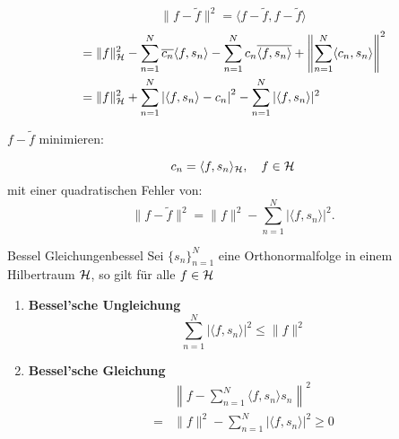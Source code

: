 \begin{equation*}
  \|f - \tilde{f}\|^{2} = \langle f - \tilde{f}, f - \tilde{f} \rangle
\end{equation*}
\begin{align*}
  &= \|f\|_{\mathcal{H}}^{2} - \sum\limits_{n=1}^{N}\overline{c_{n}} \langle f, s_{n} \rangle - \sum\limits_{n=1}^{N}c_{n} \overline{\langle f, s_{n}\rangle}  + {\left\|\sum\limits_{n=1}^{N}\langle c_{n}, s_{n} \rangle \right\|}^{2}\\
  &= \|f\|_{\mathcal{H}}^{2} + \sum\limits_{n=1}^{N}\left|\langle f, s_{n} \rangle - c_{n}\right|^{2} - \sum\limits_{n=1}^{N}|\langle f, s_{n} \rangle |^{2}
\end{align*}

$f - \tilde{f}$ minimieren:
\begin{tcolorbox}[title={Kooeffizienten für die Approximation}, colback=white!, colframe=black!40]
\begin{equation}
  c_{n} = \langle f, s_{n} \rangle_{\mathcal{H}}, \quad f \in \mathcal{H}
\end{equation}
mit einer quadratischen Fehler von:
\begin{equation}
  \|f - \tilde{f}\|^{2} = \|f\|^{2} - \sum\limits_{n=1}^{N}|\langle f,s_{n} \rangle |^{2}.
\end{equation}
\end{tcolorbox}

\begin{mytheo}{Bessel Gleichungen}{bessel}
  Sei $\{s_{n}\}_{n=1}^{N}$ eine Orthonormalfolge in einem Hilbertraum $\mathcal{H}$, so gilt für alle $f \in \mathcal{H}$
  \begin{enumerate}
    \item \textbf{Bessel'sche Ungleichung}
          \begin{equation}
            \sum\limits_{n=1}^{N} |\langle f, s_{n} \rangle|^{2} \leq \| f \|^{2}\label{eq:besselsche_ungleichung}
          \end{equation}
          \item \textbf{Bessel'sche Gleichung}
          \begin{align}
            &\left\| f - \sum\limits_{n=1}^{N} \langle f, s_{n} \rangle  s_{n}\right\|^{2}\nonumber\\
            = &\|f\|^{2} - \sum\limits_{n=1}^{N} |\langle f, s_{n} \rangle|^{2} \geq 0\label{eq:besselsche_gleichung}
          \end{align}
  \end{enumerate}
\end{mytheo}

